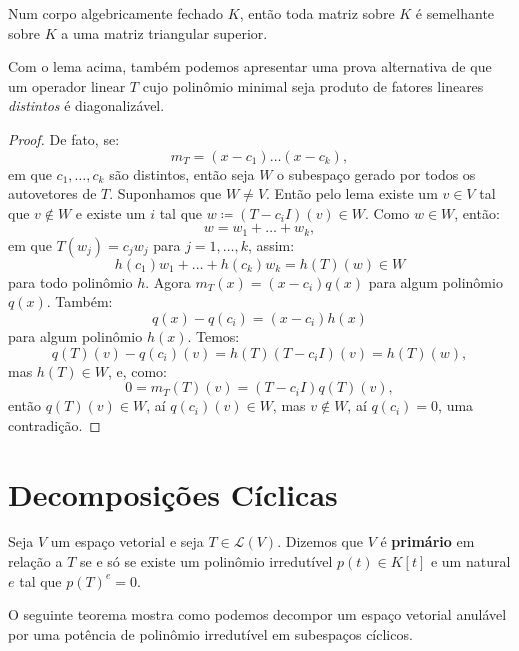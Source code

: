 \documentclass[11pt,twoside,a4paper]{book}
\begin{document}
\begin{corolario}
Num corpo algebricamente fechado $K$, então toda matriz sobre $K$ é semelhante sobre $K$ a uma matriz triangular superior.
\end{corolario}

\begin{observacao}
Com o lema acima, também podemos apresentar uma prova alternativa de que um operador linear $T$ cujo polinômio minimal seja produto de fatores lineares \emph{distintos} é diagonalizável.
\end{observacao}
\begin{proof}
De fato, se:
\[
m_T=(x-c_1)\dots(x-c_k),
\]
em que $c_1,\dots,c_k$ são distintos, então seja $W$ o subespaço gerado por todos os autovetores de $T$. Suponhamos que $W\neq V$. Então pelo lema existe um $v\in V$ tal que $v\notin W$ e existe um $i$ tal que $w\coloneqq(T-c_iI)(v)\in W$. Como $w\in W$, então:
\[
w=w_1+\dots+w_k,
\]
em que $T(w_j)=c_jw_j$ para $j=1,\dots,k$, assim:
\[
h(c_1)w_1+\dots+h(c_k)w_k=h(T)(w)\in W
\]
para todo polinômio $h$. Agora $m_T(x)=(x-c_i)q(x)$ para algum polinômio $q(x)$. Também:
\[
q(x)-q(c_i)=(x-c_i)h(x)
\]
para algum polinômio $h(x)$. Temos:
\[
q(T)(v)-q(c_i)(v)=h(T)(T-c_iI)(v)=h(T)(w),
\]
mas $h(T)\in W$, e, como:
\[
0=m_T(T)(v)=(T-c_iI)q(T)(v),
\]
então $q(T)(v)\in W$, aí $q(c_i)(v)\in W$, mas $v\notin W$, aí $q(c_i)=0$, uma contradição.
\end{proof}

\section{Decomposições Cíclicas}

\begin{definicao}
Seja $V$ um espaço vetorial e seja $T\in\mathcal{L}(V)$. Dizemos que $V$ é \textbf{primário} em relação a $T$ se e só se existe um polinômio irredutível $p(t)\in K[t]$ e um natural $e$ tal que $p(T)^e=0$.
\end{definicao}

\noindent
O seguinte teorema mostra como podemos decompor um espaço vetorial anulável por uma potência de polinômio irredutível em subespaços cíclicos.
\end{document}
